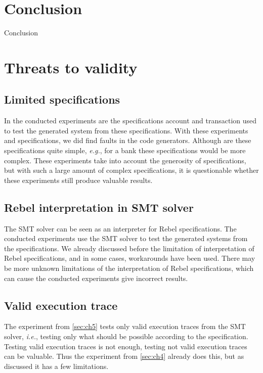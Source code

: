 \section{Conclusion}
Conclusion

\section{Threats to validity}

\subsection*{Limited specifications}
In the conducted experiments are the specifications account and transaction used
to test the generated system from these specifications. With these experiments
and specifications, we did find faults in the code generators. Although are
these specifications quite simple, \textit{e.g.}, for a bank these
specifications would be more complex. These experiments take into account the
generosity of specifications, but with such a large amount of complex
specifications, it is questionable whether these experiments still produce
valuable results.

\subsection*{Rebel interpretation in SMT solver}
The SMT solver can be seen as an interpreter for Rebel specifications. The
conducted experiments use the SMT solver to test the generated systems from the
specifications. We already discussed before the limitation of interpretation of
Rebel specifications, and in some cases, workarounds have been used. There may
be more unknown limitations of the interpretation of Rebel specifications, which
can cause the conducted experiments give incorrect results.

\subsection*{Valid execution trace}
The experiment from \autoref{sec:ch5} tests only valid execution traces from
the SMT solver, \textit{i.e.}, testing only what should be possible according to
the specification. Testing valid execution traces is not enough, testing not
valid execution traces can be valuable. Thus the experiment from
\autoref{sec:ch4} already does this, but as discussed it has a few limitations.
